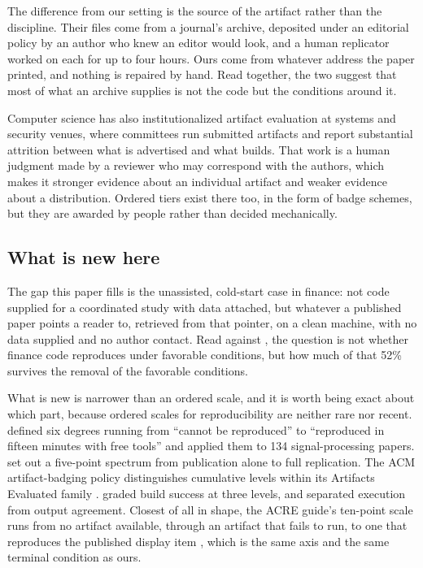 The difference from our setting is the source of the artifact rather than the
discipline. Their files come from a journal's archive, deposited under an
editorial policy by an author who knew an editor would look, and a human
replicator worked on each for up to four hours. Ours come from whatever address
the paper printed, and nothing is repaired by hand. Read together, the two
suggest that most of what an archive supplies is not the code but the conditions
around it.

Computer science has also institutionalized artifact evaluation at systems and
security venues, where committees run submitted artifacts and report substantial
attrition between what is advertised and what builds. That work is a human
judgment made by a reviewer who may correspond with the authors, which makes it
stronger evidence about an individual artifact and weaker evidence about a
distribution. Ordered tiers exist there too, in the form of badge schemes, but
they are awarded by people rather than decided mechanically.

\subsection{What is new here}\label{sec:novelty}

The gap this paper fills is the unassisted, cold-start case in finance: not code
supplied for a coordinated study with data attached, but whatever a published
paper points a reader to, retrieved from that pointer, on a clean machine, with
no data supplied and no author contact. Read against \citet{Perignon2024}, the
question is not whether finance code reproduces under favorable conditions, but
how much of that 52\% survives the removal of the favorable conditions.

What is new is narrower than an ordered scale, and it is worth being exact about
which part, because ordered scales for reproducibility are neither rare nor
recent. \citet{Vandewalle2009} defined six degrees running from ``cannot be
reproduced'' to ``reproduced in fifteen minutes with free tools'' and applied
them to 134 signal-processing papers. \citet{Peng2011} set out a five-point
spectrum from publication alone to full replication. The ACM artifact-badging
policy distinguishes cumulative levels within its Artifacts Evaluated family
\citep{ACMBadging2020}. \citet{Collberg2015} graded build success at three
levels, and \citet{Pimentel2019} separated execution from output agreement.
Closest of all in shape, the ACRE guide's ten-point scale runs from no artifact
available, through an artifact that fails to run, to one that reproduces the
published display item \citep{ACREGuide}, which is the same axis and the same
terminal condition as ours.

